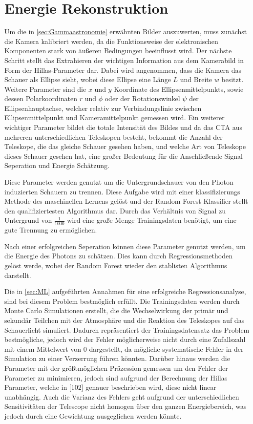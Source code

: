 \section{Energie Rekonstruktion}

Um die in \autoref{sec:Gammaastronomie} erwähnten Bilder auszuwerten, muss zunächst die Kamera kalibriert werden, da die Funktionsweise der elektronischen
Komponenten stark von äußeren Bedingungen beeinflusst wird.
Der nächste Schritt stellt das Extrahieren der wichtigen Information aus dem Kamerabild in Form der Hillas-Parameter dar.
Dabei wird angenommen, dass die Kamera das Schauer als Ellipse sieht, wobei diese Ellipse eine Länge $L$ und Breite $w$ besitzt.
Weitere Parameter sind die $x$ und $y$ Koordinate des Ellipsenmittelpunkts, sowie dessen Polarkoordinaten $r$ und $\phi$ oder der Rotationswinkel $\psi$
der Ellipsenhauptachse, welcher relativ zur Verbindungslinie zwischen Ellipsenmittelpunkt und Kameramittelpunkt gemessen wird.
Ein weiterer wichtiger Parameter bildet die totale Intensität des Bildes und da das CTA aus mehreren unterschiedlichen Teleskopen besteht, bekommt die Anzahl
der Teleskope, die das gleiche Schauer gesehen haben, und welche Art von Teleskope dieses Schauer gesehen hat, eine großer Bedeutung für die Anschließende
Signal Seperation und Energie Schätzung.

Diese Parameter werden genutzt um die Untergrundschauer von den Photon induzierten Schauern zu trennen.
Diese Aufgabe wird mit einer klassifizierungs Methode des maschinellen Lernens gelöst und der
Random Forest Klassifier stellt den qualifiziertesten Algorithmus dar.
Durch das Verhältnis von Signal zu Untergrund von $\frac{1}{1000}$\cite{Cherenkov_Licht} wird eine große Menge Trainingsdaten
benötigt, um eine gute Trennung zu ermöglichen.

Nach einer erfolgreichen Seperation können diese Parameter genutzt werden, um die Energie des Photons zu schätzen.
Dies kann durch Regressionsmethoden gelöst werde, wobei der Random Forest wieder den stablisten Algorithmus darstellt\cite{Cherenkov_Licht}.

Die in \autoref{sec:ML} aufgeführten Annahmen für eine erfolgreiche Regressionsanalyse, sind bei diesem Problem bestmöglich erfüllt. Die Trainingsdaten
werden durch Monte Carlo Simulationen erstellt, die die Wechselwirkung der primär und sekundär Teilchen mit der Atmosphäre und die Reaktion des Teleskopes
auf das Schauerlicht simuliert.
Dadurch repräsentiert der Trainingsdatensatz das Problem bestmögliche, jedoch wird der Fehler möglicherweise nicht durch eine Zufallszahl mit einem Mittelwert von $0$ dargestellt, da
mögliche systematische Fehler in der Simulation zu einer Verzerrung führen könnten.
Darüber hinaus werden die Parameter mit der größtmöglichen Präzession gemessen um den Fehler der Parameter zu minimieren,
jedoch sind aufgrund der Berechnung der Hillas Parameter, welche in [102]\cite{HESS}
genauer beschrieben wird, diese nicht linear unabhängig.
Auch die Varianz des Fehlers geht aufgrund der unterschiedlichen Sensitivitäten der Telescope nicht homogen
über den ganzen Energiebereich, was jedoch durch eine Gewichtung ausgeglichen werden könnte.

